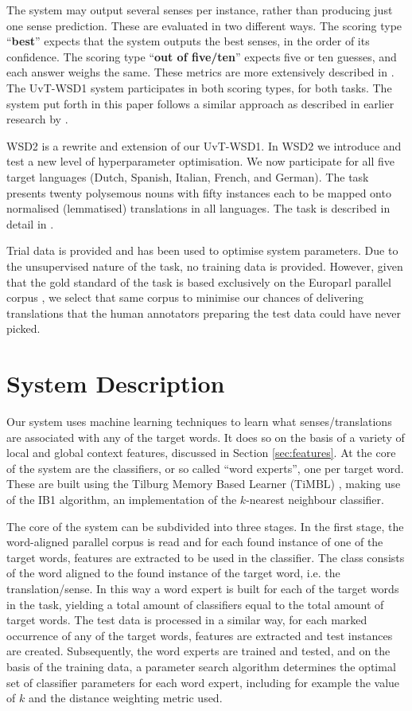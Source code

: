 The system may output several senses per instance, rather than producing just
one sense prediction. These are evaluated in two different ways. The scoring
type ``\textbf{best}'' expects that the system outputs the best senses, in the
order of its confidence. The scoring type ``\textbf{out of five/ten}'' expects
five or ten guesses, and each answer weighs the same. These metrics are more
extensively described in \citep{CLLS}. The UvT-WSD1 system participates in both
scoring types, for both tasks. The system put forth in this paper follows a
similar approach as described in earlier research by \citep{Hoste+02}.

WSD2 is a rewrite and extension of our UvT-WSD1. In WSD2 we introduce and test
a new level of hyperparameter optimisation. We now participate for all five
target languages (Dutch, Spanish, Italian, French, and German). The task
presents twenty polysemous nouns with fifty instances each to be mapped onto
normalised (lemmatised) translations in all languages. The task is described in
detail in \citep{CLWSD2013TASKPAPER}.

Trial data is provided and has been used to optimise system
parameters. Due to the unsupervised nature of the task, no training data is
provided. However, given that the gold standard of the task is based
exclusively on the Europarl parallel corpus \citep{EUROPARL}, we select that
same corpus to minimise our chances of delivering translations that the human
annotators preparing the test data could have never picked.

\section{System Description}

Our system uses machine learning techniques to learn what
senses/translations are associated with any of the target words. It does so on
the basis of a variety of local and global context features, discussed in
Section \ref{sec:features}. At the core of the system are the classifiers, or
so called ``word experts'', one per target word. These are built using the
Tilburg Memory Based Learner (TiMBL) \citep{TIMBL}, making use of the IB1
algorithm, an implementation of the $k$-nearest neighbour classifier.

The core of the system can be subdivided into three stages. In the
first stage, the word-aligned parallel corpus is read and for each found
instance of one of the target words, features are extracted to be used in the
classifier. The class consists of the word aligned to the found instance of the
target word, i.e. the translation/sense. In this way a word expert is built for
each of the target words in the task, yielding a total amount of classifiers
equal to the total amount of target words. The test data is processed in a
similar way, for each marked occurrence of any of the target words, features
are extracted and test instances are created. Subsequently, the word experts
are trained and tested, and on the basis of the training data, a parameter
search algorithm \citep{PARAMSEARCH} determines the optimal set of classifier
parameters for each word expert, including for example the value of $k$ and the
distance weighting metric used.

